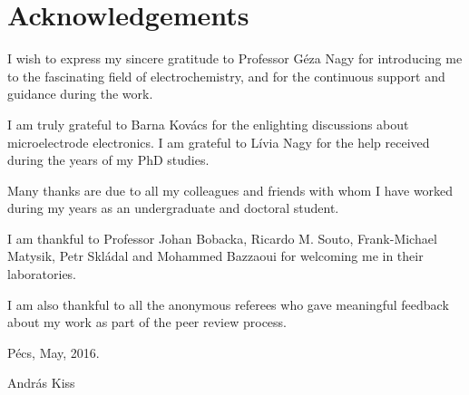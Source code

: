 \chapter*{Acknowledgements}
I wish to express my sincere gratitude to Professor Géza Nagy for introducing me to the fascinating field of electrochemistry, and for the continuous support and guidance during the work. 

\vspace{5mm}

I am truly grateful to Barna Kovács for the enlighting discussions about microelectrode electronics.
I am grateful to Lívia Nagy for the help received during the years of my PhD studies.

\vspace{5mm}

Many thanks are due to all my colleagues and friends with whom I have worked during my years as an undergraduate and doctoral student.

\vspace{5mm}

I am thankful to Professor Johan Bobacka, Ricardo M. Souto, Frank-Michael Matysik, Petr Skládal and Mohammed Bazzaoui for welcoming me in their laboratories.

\vspace{5mm}

I am also thankful to all the anonymous referees who gave meaningful feedback about my work as part of the peer review process.

\vspace{20mm}

Pécs, May, 2016.

\vspace{5mm}

András Kiss
